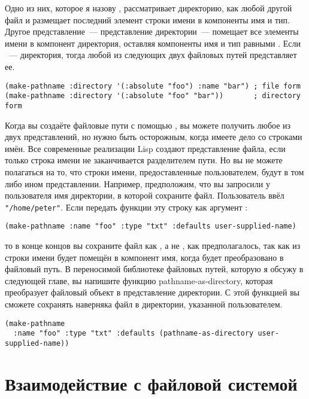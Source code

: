 Одно из них, которое я назову , рассматривает директорию, как
любой другой файл и размещает последний элемент строки имени в компоненты имя и
тип. Другое представление~--- представление директории~--- помещает все элементы имени в
компонент директория, оставляя компоненты имя и тип равными . Если
~--- директория, тогда любой из следующих двух файловых путей представляет
ее.

\begin{lstlisting}
(make-pathname :directory '(:absolute "foo") :name "bar") ; file form 
(make-pathname :directory '(:absolute "foo" "bar"))       ; directory form 
\end{lstlisting}

Когда вы создаёте файловые пути с помощью , вы можете получить любое
из двух представлений, но нужно быть осторожным, когда имеете дело со строками имён. Все
современные реализации Lisp создают представление файла, если только строка имени не
заканчивается разделителем пути. Но вы не можете полагаться на то, что строки имени,
предоставленные пользователем, будут в том либо ином представлении. Например, предположим,
что вы запросили у пользователя имя директории, в которой сохраните файл. Пользователь
ввёл \lstinline!"/home/peter"!. Если передать функции  эту строку как
аргумент :

\begin{lstlisting}
(make-pathname :name "foo" :type "txt" :defaults user-supplied-name) 
\end{lstlisting}

то в конце концов вы сохраните файл как , а не
, как предполагалось, так как  из строки имени
будет помещён в компонент имя, когда  будет преобразовано в
файловый путь. В переносимой библиотеке файловых путей, которую я обсужу в следующей
главе, вы напишите функцию pathname-as-directory, которая преобразует файловый объект в
представление директории. С этой функцией вы сможете сохранять наверняка файл в
директории, указанной пользователем.

\begin{lstlisting}
(make-pathname 
  :name "foo" :type "txt" :defaults (pathname-as-directory user-supplied-name))
\end{lstlisting}

\section{Взаимодействие с файловой системой}

